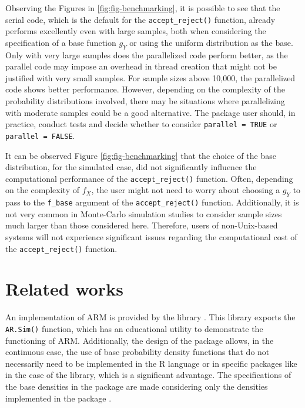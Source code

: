 Observing the Figures in \ref{fig:fig-benchmarking}, it is possible to see that the serial code, which is the default for the \texttt{accept\_reject()} function, already performs excellently even with large samples, both when considering the specification of a base function \(g_Y\) or using the uniform distribution as the base. Only with very large samples does the parallelized code perform better, as the parallel code may impose an overhead in thread creation that might not be justified with very small samples. For sample sizes above 10,000, the parallelized code shows better performance. However, depending on the complexity of the probability distributions involved, there may be situations where parallelizing with moderate samples could be a good alternative. The package user should, in practice, conduct tests and decide whether to consider \texttt{parallel\ =\ TRUE} or \texttt{parallel\ =\ FALSE}.

It can be observed Figure \ref{fig:fig-benchmarking} that the choice of the base distribution, for the simulated case, did not significantly influence the computational performance of the \texttt{accept\_reject()} function. Often, depending on the complexity of \(f_X\), the user might not need to worry about choosing a \(g_Y\) to pass to the \texttt{f\_base} argument of the \texttt{accept\_reject()} function. Additionally, it is not very common in Monte-Carlo simulation studies to consider sample sizes much larger than those considered here. Therefore, users of non-Unix-based systems will not experience significant issues regarding the computational cost of the \texttt{accept\_reject()} function.

\section{Related works}\label{related-works}

An implementation of ARM is provided by the  library \citep{AR}. This library exports the \texttt{AR.Sim()} function, which has an educational utility to demonstrate the functioning of ARM. Additionally, the design of the  package allows, in the continuous case, the use of base probability density functions that do not necessarily need to be implemented in the R language or in specific packages like in the case of the  library, which is a significant advantage. The specifications of the base densities in the  package are made considering only the densities implemented in the  package \citep{DISTRIB}.

